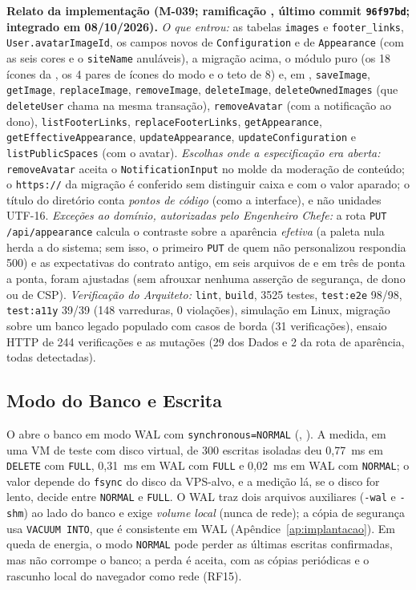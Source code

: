 \textbf{Relato da implementação (M-039; ramificação , último commit \texttt{96f97bd}; integrado em 08/10/2026).} \emph{O que entrou:} as tabelas \texttt{images} e \texttt{footer\_links}, \texttt{User.avatarImageId}, os campos novos de \texttt{Configuration} e de \texttt{Appearance} (com as seis cores e o \texttt{siteName} anuláveis), a migração acima, o módulo puro  (os 18 ícones da , os 4 pares de ícones do modo e o teto de 8) e, em , \texttt{saveImage}, \texttt{getImage}, \texttt{replaceImage}, \texttt{removeImage}, \texttt{deleteImage}, \texttt{deleteOwnedImages} (que \texttt{deleteUser} chama na mesma transação), \texttt{removeAvatar} (com a notificação ao dono), \texttt{listFooterLinks}, \texttt{replaceFooterLinks}, \texttt{getAppearance}, \texttt{getEffectiveAppearance}, \texttt{updateAppearance}, \texttt{updateConfiguration} e \texttt{listPublicSpaces} (com o avatar). \emph{Escolhas onde a especificação era aberta:} \texttt{removeAvatar} aceita o \texttt{NotificationInput} no molde da moderação de conteúdo; o \texttt{https://} da migração é conferido sem distinguir caixa e com o valor aparado; o título do diretório conta \emph{pontos de código} (como a interface), e não unidades UTF-16. \emph{Exceções ao domínio, autorizadas pelo Engenheiro Chefe:} a rota \texttt{PUT /api/appearance} calcula o contraste sobre a aparência \emph{efetiva} (a paleta nula herda a do sistema; sem isso, o primeiro \texttt{PUT} de quem não personalizou respondia 500) e as expectativas do contrato antigo, em seis arquivos de  e em três  de ponta a ponta, foram ajustadas (sem afrouxar nenhuma asserção de segurança, de dono ou de CSP). \emph{Verificação do Arquiteto:} \texttt{lint}, \texttt{build}, 3525 testes, \texttt{test:e2e} 98/98, \texttt{test:a11y} 39/39 (148 varreduras, 0 violações), simulação em Linux, migração sobre um banco legado populado com casos de borda (31 verificações), ensaio HTTP de 244 verificações e as mutações (29 dos Dados e 2 da rota de aparência, todas detectadas).

\subsection{Modo do Banco e Escrita}\label{sec:arq-wal}

O  abre o banco em modo WAL com \texttt{synchronous=NORMAL} (, ). A medida, em uma VM de teste com disco virtual, de 300 escritas isoladas deu 0,77~ms em \texttt{DELETE} com \texttt{FULL}, 0,31~ms em WAL com \texttt{FULL} e 0,02~ms em WAL com \texttt{NORMAL}; o valor depende do \texttt{fsync} do disco da VPS-alvo, e a medição lá, se o disco for lento, decide entre \texttt{NORMAL} e \texttt{FULL}. O WAL traz dois arquivos auxiliares (\texttt{-wal} e \texttt{-shm}) ao lado do banco e exige \emph{volume local} (nunca de rede); a cópia de segurança usa \texttt{VACUUM INTO}, que é consistente em WAL (Apêndice~\ref{ap:implantacao}). Em queda de energia, o modo \texttt{NORMAL} pode perder as últimas escritas confirmadas, mas não corrompe o banco; a perda é aceita, com as cópias periódicas e o rascunho local do navegador como rede (RF15).

